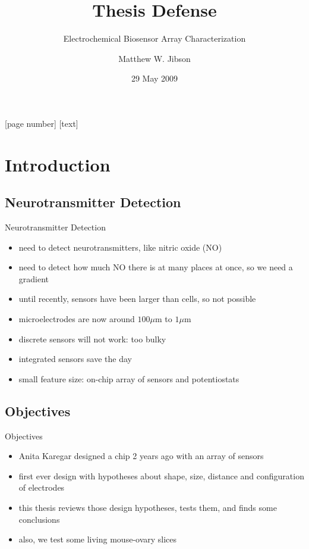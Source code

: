 \documentclass[10pt]{beamer}
\title{Thesis Defense}
\subtitle{Electrochemical Biosensor Array Characterization}
\author[M.W. Jibson]{Matthew W. Jibson}
\institute{Colorado State University}
\date{29 May 2009}
\begin{document}
[page number]
[text]

\begin{frame}
	\titlepage
\end{frame}

\section{Introduction}
\subsection{Neurotransmitter Detection}
\begin{frame}{Neurotransmitter Detection}
	\begin{itemize}
		\item need to detect neurotransmitters, like nitric oxide (NO)
		\item need to detect how much NO there is at many places at once, so we need a gradient
		\item until recently, sensors have been larger than cells, so not possible
		\item microelectrodes are now around $100 \mu \mathrm{m}$ to $1 \mu \mathrm{m}$
		\item discrete sensors will not work: too bulky
		\item integrated sensors save the day
		\item small feature size: on-chip array of sensors and potentiostats
	\end{itemize}
\end{frame}

\subsection{Objectives}
\begin{frame}{Objectives}
	\begin{itemize}
		\item Anita Karegar designed a chip 2 years ago with an array of sensors
		\item first ever design with hypotheses about shape, size, distance and configuration of electrodes
		\item this thesis reviews those design hypotheses, tests them, and finds some conclusions
		\item also, we test some living mouse-ovary slices
	\end{itemize}
\end{frame}
\end{document}
